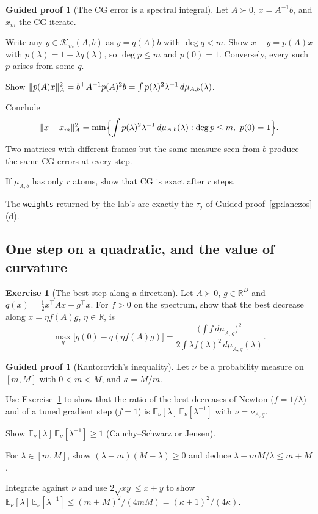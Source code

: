 \documentclass[11pt,a4paper]{article}
\newcommand{\R}{\mathbb{R}}
\newcommand{\E}{\mathbb{E}}
\DeclarePairedDelimiter{\norm}{\lVert}{\rVert}
\theoremstyle{plain}
\theoremstyle{definition}
\newtheorem{exercise}[proposition]{Exercise}
\newtheorem{guided}[proposition]{Guided proof}
\theoremstyle{remark}
\begin{document}
\begin{guided}[The CG error is a spectral integral]\label{gp:cg}
Let $A\succ0$, $x=A^{-1}b$, and $x_m$ the CG iterate.
\begin{steps}
\item Write any $y\in\mathcal{K}_m(A,b)$ as $y=q(A)b$ with $\deg q<m$. Show $x-y=p(A)x$ with $p(\lambda)=1-\lambda q(\lambda)$,
  so $\deg p\le m$ and $p(0)=1$. Conversely, every such $p$ arises from some $q$.
\item Show $\norm{p(A)x}_A^2=b^\top A^{-1}p(A)^2b=\int p(\lambda)^2\lambda^{-1}\,d\mu_{A,b}(\lambda)$.
\item Conclude
  \[\norm{x-x_m}_A^2=\min\Bigl\{\int p(\lambda)^2\lambda^{-1}\,d\mu_{A,b}(\lambda):\deg p\le m,\ p(0)=1\Bigr\}.\]
  Two matrices with different frames but the same measure seen from $b$ produce the same CG errors at every step.
\item If $\mu_{A,b}$ has only $r$ atoms, show that CG is exact after $r$ steps.
\end{steps}
\end{guided}

The \texttt{weights} returned by the lab's  are exactly the $\tau_j$ of
Guided proof~\ref{gp:lanczos}(d).

\subsection{One step on a quadratic, and the value of curvature}

\begin{exercise}[The best step along a direction]\label{ex:step}
Let $A\succ0$, $g\in\R^D$ and $q(x)=\frac12x^\top Ax-g^\top x$. For $f>0$ on the spectrum, show that the best decrease
along $x=\eta f(A)g$, $\eta\in\R$, is
\[\max_\eta\bigl[q(0)-q(\eta f(A)g)\bigr]=\frac{\bigl(\int f\,d\mu_{A,g}\bigr)^2}{2\int\lambda f(\lambda)^2\,d\mu_{A,g}(\lambda)}.\]
\end{exercise}

\begin{guided}[Kantorovich's inequality]\label{gp:kantorovich}
Let $\nu$ be a probability measure on $[m,M]$ with $0<m<M$, and $\kappa=M/m$.
\begin{steps}
\item Use Exercise~\ref{ex:step} to show that the ratio of the best decreases of Newton ($f=1/\lambda$) and of a tuned
  gradient step ($f=1$) is $\E_\nu[\lambda]\,\E_\nu[\lambda^{-1}]$ with $\nu=\nu_{A,g}$.
\item Show $\E_\nu[\lambda]\,\E_\nu[\lambda^{-1}]\ge1$ (Cauchy--Schwarz or Jensen).
\item For $\lambda\in[m,M]$, show $(\lambda-m)(M-\lambda)\ge0$ and deduce $\lambda+mM/\lambda\le m+M$.
\item Integrate against $\nu$ and use $2\sqrt{xy}\le x+y$ to show
  $\E_\nu[\lambda]\,\E_\nu[\lambda^{-1}]\le(m+M)^2/(4mM)=(\kappa+1)^2/(4\kappa)$.
\end{steps}
\end{guided}
\end{document}
